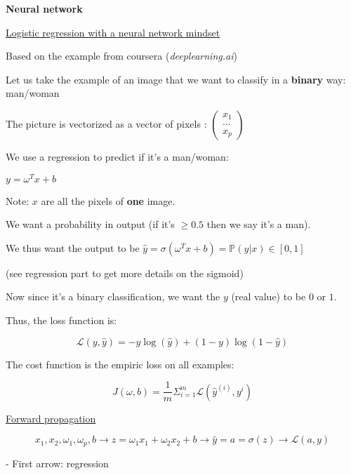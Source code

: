 {\fontsize{12pt}{22pt} \textbf{Neural network}\par}

\vspace{5mm}

\underline{Logistic regression with a neural network mindset}

Based on the example from coursera (\textit{deeplearning.ai})

Let us take the example of an image that we want to classify in a \textbf{binary} way: man/woman

The picture is vectorized as a vector of pixels : $\begin{pmatrix}x_1\\...\\x_p\end{pmatrix}$

We use a regression to predict if it's a man/woman:

$y=\omega^Tx + b$

Note: $x$ are all the pixels of \textbf{one} image.

\vspace{5mm}

We want a probability in output (if it's $\ge 0.5$ then we say it's a man).

We thus want the output to be $\widehat{y}=\sigma(\omega^Tx + b)=\mathbb{P}(y|x) \in [0,1]$

(see regression part to get more details on the sigmoid)

\vspace{5mm}

Now since it's a binary classification, we want the $y$ (real value) to be $0$ or $1$.

Thus, the loss function is:

$$\mathcal{L}(y, \widehat{y})=-y\log(\widehat{y})+(1-y)\log(1-\widehat{y})$$

\vspace{5mm}

The cost function is the empiric loss on all examples:

$$J(\omega, b)=\frac{1}{m}\Sigma_{i=1}^m\mathcal{L}(\widehat{y}^{(i)}, y^i)$$

\vspace{5mm}

\underline{Forward propagation}

$$x_1,x_2, \omega_1,\omega_p,b \to z=\omega_1x_1 + \omega_2x_2 + b \to \widehat{y}=a=\sigma(z) \to \mathcal{L}(a,y)$$

- First arrow: regression


